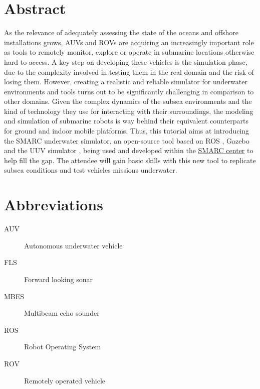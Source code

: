 \documentclass[
10pt, %
a4paper, %
oneside, %
BCOR5mm, %
]{scrartcl}
\begin{document}
\section*{Abstract} 
As the relevance of adequately assessing the state of the oceans and offshore installations grows, AUVs and ROVs are acquiring an increasingly important role as tools to remotely monitor, explore or operate in submarine locations otherwise hard to access.
A key step on developing these vehicles is the simulation phase, due to the complexity involved in testing them in the real domain and the risk of losing them.
However, creating a realistic and reliable simulator for underwater environments and tools turns out to be significantly challenging in comparison to other domains.
Given the complex dynamics of the subsea environments and the kind of technology they use for interacting with their surroundings, the modeling and simulation of submarine robots is way behind their equivalent counterparts for ground and indoor mobile platforms.
Thus, this tutorial aims at introducing the SMARC underwater simulator, an open-source tool based on ROS \cite{Quigley09}, Gazebo \cite{koenig2004design} and the UUV simulator \cite{Manhaes_2016}, being used and developed within the \href{https://smarc.se/}{SMARC center} to help fill the gap. 
The attendee will gain basic skills with this new tool to replicate subsea conditions and test vehicles missions underwater.


\section{Abbreviations}
\label{sec:abbreviations}
\begin{description}
\item [AUV] Autonomous underwater vehicle
\item [FLS] Forward looking sonar
\item [MBES] Multibeam echo sounder
\item [ROS] Robot Operating System
\item [ROV] Remotely operated vehicle
\end{description}


\end{document}
